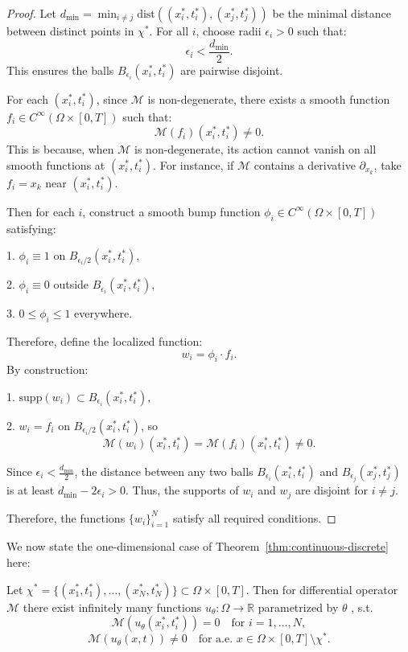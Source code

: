 \begin{proof}
    Let $d_{\text{min}} = \min_{i \neq j} \text{dist}\left((x^*_i,t^*_i), (x^*_j,t^*_j)\right)$ be the minimal distance between distinct points in $\chi^*$. For all $i$, choose radii $\epsilon_i > 0$ such that:  
$$
\epsilon_i < \frac{d_{\text{min}}}{2}.
$$  
This ensures the balls $B_{\epsilon_i}(x^*_i,t^*_i)$ are pairwise disjoint.  

For each $(x^*_i,t^*_i)$, since $\mathcal{M}$ is non-degenerate, there exists a smooth function $f_i \in C^\infty(\Omega \times [0,T])$ such that:  
$$
\mathcal{M}(f_i)(x^*_i,t^*_i) \neq 0.
$$  This is because, when $\mathcal{M}$ is non-degenerate, its action cannot vanish on all smooth functions at $(x^*_i,t^*_i)$. For instance, if $\mathcal{M}$ contains a derivative $\partial_{x_k}$, take $f_i = x_k$ near $(x^*_i,t^*_i)$.

Then for each $i$, construct a smooth bump function $\phi_i \in C^\infty(\Omega \times [0,T])$ satisfying:  

1. $\phi_i \equiv 1$ on $B_{\epsilon_i/2}(x^*_i,t^*_i)$, 

2. $\phi_i \equiv 0$ outside $B_{\epsilon_i}(x^*_i,t^*_i)$, 

3. $0 \leq \phi_i \leq 1$ everywhere.  

Therefore, define the localized function:  
$$
w_i = \phi_i \cdot f_i.
$$  
By construction:  

1. $\text{supp}(w_i) \subset B_{\epsilon_i}(x^*_i,t^*_i)$,

2. $w_i = f_i$ on $B_{\epsilon_i/2}(x^*_i,t^*_i)$, so  
$$
\mathcal{M}(w_i)(x^*_i,t^*_i) = \mathcal{M}(f_i)(x^*_i,t^*_i) \neq 0.
$$  

Since $\epsilon_i < \frac{d_{\text{min}}}{2}$, the distance between any two balls $B_{\epsilon_i}(x^*_i,t^*_i)$ and $B_{\epsilon_j}(x^*_j,t^*_j)$ is at least $d_{\text{min}} - 2\epsilon_i > 0$. Thus, the supports of $w_i$ and $w_j$ are disjoint for $i \neq j$. 

Therefore, the functions $\{w_i\}_{i=1}^N$ satisfy all required conditions.  


\end{proof}



We now state the one-dimensional case of Theorem~\ref{thm:continuous-discrete} here:

\begin{lemma}
\label{lemma:1d}
    Let $\chi^* = \{(x^*_1,t^*_1),\dots,(x^*_N,t^*_N)\}\subset \Omega\times[0,T]$. Then for differential operator $\mathcal M$ there exist infinitely many functions
$u_\theta : \Omega \to \mathbb{R}$ parametrized by $\theta$ , s.t.
$$ \mathcal{M}(u_\theta(x^*_i,t^*_i)) = 0 \quad \text{for } i=1,\dots,N,$$ $$ 
   \mathcal{M}(u_\theta(x,t)) \neq 0
   \quad \text{for a.e. } x \in \Omega\times[0,T] \setminus \chi^*.$$
\end{lemma}

